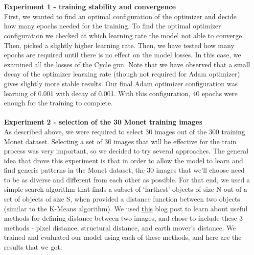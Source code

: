 \documentclass{article}
\begin{document}
\\\\
\newblock
\textbf{Experiment 1 - training stability and convergence}
\\
First, we wanted to find an optimal configuration of the optimizer and decide how many epochs needed for the training.
To find the optimal optimizer configuration we checked at which learning rate the model not able to converge. Then, picked a slightly higher learning rate.
Then, we have tested how many epochs are required until there is no effect on the model losses. In this case, we examined all the losses of the Cycle gun.
Note that we have observed that a small decay of the optimizer learning rate (though not required for Adam optimizer) gives slightly more stable results.
Our final Adam optimizer configuration was learning of 0.001 with decay of 0.001.
With this configuration, 40 epochs were enough for the training to complete.
\\\\
\newblock
\textbf{Experiment 2 - selection of the 30 Monet training images}
\\
As described above, we were required to select 30 images out of the 300 training Monet dataset. Selecting a set of 30 images that will be effective for the train process was very important, so we decided to try several approaches. The general idea that drove this experiment is that in order to allow the model to learn and find generic patterns in the Monet dataset, the 30 images that we’ll choose need to be as diverse and different from each other as possible. For that end, we used a simple search algorithm that finds a subset of ‘farthest’ objects of size N out of a set of objects of size S, when provided a distance function between two objects (similar to the K-Means algorithm). We used \href{https://gist.github.com/duhaime/211365edaddf7ff89c0a36d9f3f7956c}{this} blog post to learn about useful methods for defining distance between two images, and chose to include these 3 methods - pixel distance, structural distance, and earth mover’s distance. We trained and evaluated our model using each of these methods, and here are the results that we got:
\end{document}
